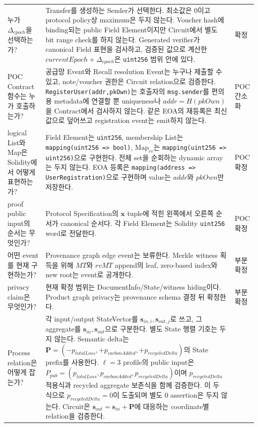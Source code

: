 \documentclass[11pt]{extarticle}
\newcommand{\Map}[1]{\mathrm{Map}_{#1}}
\begin{document}
{\begin{longtable}[]{@{}L{0.24\textwidth}L{0.56\textwidth}L{0.12\textwidth}@{}}
누가 $\Delta_{epoch}$을 선택하는가? & Transfer를 생성하는 Sender가 선택한다.
최소값은 0이고 protocol policy상 maximum은 두지 않는다. Voucher hash에 binding되는
public Field Element이지만 Circuit에서 별도 bit range check를 하지 않는다. Generated
verifier가 canonical Field 표현을 검사하고, 검증된 값으로 계산한
$currentEpoch+\Delta_{epoch}$은 \texttt{uint256} 범위 안에 있다. & 확정 \\
POC Contract 함수는 누가 호출하는가? & 공급망 Event와 Recall resolution Event는 누구나
제출할 수 있고, note/voucher 권한은 Circuit relation으로 검증한다.
\texttt{RegisterUser(addr,pkOwn)}는 호출자의 \texttt{msg.sender}를 편의용 metadata에
연결할 뿐 uniqueness나 $addr=H(pkOwn)$을 Contract에서 검사하지 않는다. 같은 EOA의
재등록은 최신 값으로 덮어쓰고 registration event는 emit하지 않는다. & POC 간소화 \\
logical List와 Map은 Solidity에서 어떻게 표현하는가? & Field Element는
\texttt{uint256}, membership List는 \texttt{mapping(uint256 => bool)},
$\Map{rv}$는 \texttt{mapping(uint256 => uint256)}으로 구현한다. 전체 set을 순회하는
dynamic array는 두지 않는다. EOA 등록은
\texttt{mapping(address => UserRegistration)}으로 구현하며 value는 $addr$와
$pkOwn$만 저장한다. & POC 확정 \\
proof public input의 순서는 무엇인가? & Protocol Specification의 $\mathbf{x}$ tuple에
적힌 왼쪽에서 오른쪽 순서가 canonical 순서다. 각 Field Element는 Solidity
\texttt{uint256} word로 전달한다. & POC 확정 \\
어떤 event를 현재 구현하는가? & Provenance graph edge event는 보류한다.
Merkle witness 획득을 위해 $MT$와 $rvMT$ append의 leaf, zero-based index와
new root는 event로 공개한다. & 부분 확정 \\
privacy claim은 무엇인가? & 현재 확정 범위는 DocumentInfo/State/witness
hiding이다. Product graph privacy는 provenance schema 결정 뒤 확정한다. & 부분 확정 \\
Process relation은 어떻게 잡는가? & 각 input/output StateVector를
$\mathbf{s}_{in,i},\mathbf{s}_{out,j}$로 쓰고, 그 aggregate를
$\mathbf{s}_{in},\mathbf{s}_{out}$으로 구분한다. 별도 State 행렬 기호는 두지 않는다.
Semantic delta는 $\mathbf{P}=(-p_{totalLoss},+p_{carbonAdded},+p_{recycledDelta})$의 State prefix를
사용한다. $\ell=3$ profile의 public input은
$P_{pub}=(p_{totalLoss},p_{carbonAdded},p_{recycledDelta})$이며
$p_{recycledDelta}$ 적용식과 recycled aggregate 보존식을 함께 검증한다. 이 두 식으로
$p_{recycledDelta}=0$이 도출되며 별도 0 assertion은 두지 않는다. Circuit은
$\mathbf{s}_{out}=\mathbf{s}_{in}+\mathbf{P}$에 대응하는 coordinate별 relation을 검증한다.

\end{longtable}}
\end{document}
